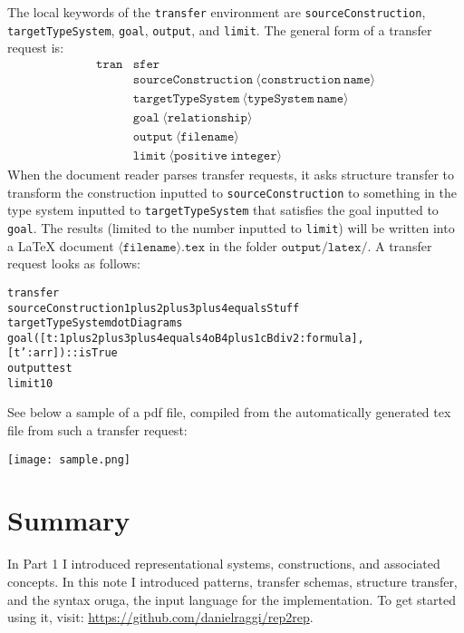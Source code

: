 \documentclass[a4paper]{article}
\theoremstyle{definition}
\begin{document}
	The local keywords of the \texttt{transfer} environment are \texttt{sourceConstruction}, \texttt{targetTypeSystem}, \texttt{goal}, \texttt{output}, and \texttt{limit}. The general form of a transfer request is:
	\begin{align*}
	\mathtt{tran}& \mathtt{sfer}\\[-3pt]
	& \mathtt{sourceConstruction\ \langle construction\ name \rangle}\\[-3pt]
	& \mathtt{targetTypeSystem\  \langle typeSystem\ name \rangle}\\[-3pt]
	& \mathtt{goal\  \langle relationship \rangle}\\[-3pt]
	& \mathtt{output\  \langle filename \rangle}\\[-3pt]
	& \mathtt{limit\  \langle positive\ integer \rangle}
	\end{align*}
	When the document reader parses transfer requests, it asks structure transfer to transform the construction inputted to \texttt{sourceConstruction} to something in the type system inputted to \texttt{targetTypeSystem} that satisfies the goal inputted to \texttt{goal}. The results (limited to the number inputted to \texttt{limit}) will be written into a LaTeX document $\mathtt{\langle filename \rangle.tex}$ in the folder $\mathtt{output/latex/}$. A transfer request looks as follows:
\begin{alltt}
transfer
    sourceConstruction 1plus2plus3plus4equalsStuff
    targetTypeSystem dotDiagrams
    goal ([t:1plus2plus3plus4equals4oB4plus1cBdiv2:formula],[t':arr]) :: isTrue
    output test
    limit 10
\end{alltt}
	See below a sample of a pdf file, compiled from the automatically generated tex file from such a transfer request:
	\begin{center}
		\texttt{[image: sample.png]}
	\end{center}

\section{Summary}
In Part 1 I introduced representational systems, constructions, and associated concepts. In this note I introduced patterns, transfer schemas, structure transfer, and the syntax oruga, the input language for the implementation. To get started using it, visit: \url{https://github.com/danielraggi/rep2rep}.
\end{document}
